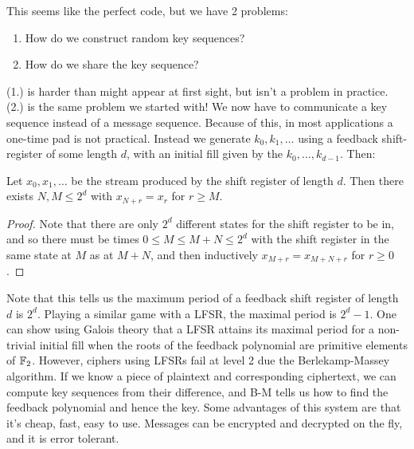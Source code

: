 \documentclass[10pt,a4paper]{article}
\begin{document}
This seems like the perfect code, but we have 2 problems:
\begin{enumerate}
\item How do we construct random key sequences?
\item How do we share the key sequence?
\end{enumerate}
(1.) is harder than might appear at first sight, but isn't a problem in practice. (2.) is the same problem we started with! We now have to communicate a key sequence instead of a message sequence. Because of this, in most applications a one-time pad is not practical. Instead we generate $k_0, k_1, \ldots$ using a feedback shift-register of some length $d$, with an initial fill given by the $k_0, \ldots, k_{d-1}$. Then:
\begin{lemma}
Let $x_0, x_1, \ldots$ be the stream produced by the shift register of length $d$. Then there exists $N,M \leq 2^d$ with $x_{N+r} = x_r$ for $r \geq M$.
\end{lemma}
\begin{proof}
Note that there are only $2^d$ different states for the shift register to be in, and so there must be times $0\leq M\leq M+N\leq 2^d$ with the shift register in the same state at $M$ as at $M+N$, and then inductively $x_{M+r} = x_{M+N+r}$ for $r \geq 0$.
\end{proof}
Note that this tells us the maximum period of a feedback shift register of length $d$ is $2^d$. Playing a similar game with a LFSR, the maximal period is $2^d-1$. One can show using Galois theory that a LFSR attains its maximal period for a non-trivial initial fill when the roots of the feedback polynomial are primitive elements of $\mathbb{F}_2$. However, ciphers using LFSRs fail at level 2 due the Berlekamp-Massey algorithm. If we know a piece of plaintext and corresponding ciphertext, we can compute key sequences from their difference, and B-M tells us how to find the feedback polynomial and hence the key. Some advantages of this system are that it's cheap, fast, easy to use. Messages can be encrypted and decrypted on the fly, and it is error tolerant. 
\end{document}
